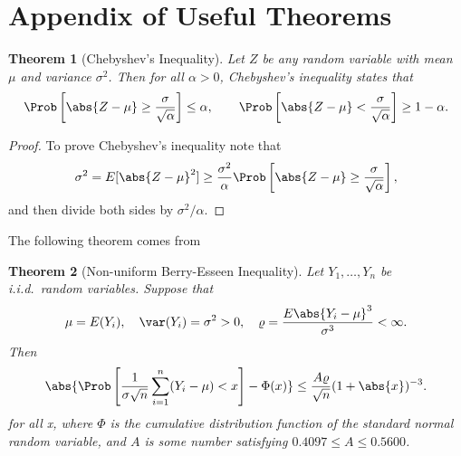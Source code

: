 \documentclass[12pt]{amsart}
\newtheorem{theorem}{Theorem}
\begin{document}
\section*{Appendix of Useful Theorems}
\begin{theorem}[Chebyshev's Inequality] \label{Chebineqthm} Let $Z$ be any random variable with mean $\mu$ and variance $\sigma^2$.  Then for all $\alpha >0$, Chebyshev's inequality states that
\[
\Prob\left[\abs{Z-\mu} \ge \frac{\sigma}{\sqrt{\alpha}} \right] \le \alpha, \qquad \Prob\left[\abs{Z-\mu} < \frac{\sigma}{\sqrt{\alpha}} \right] \ge 1-\alpha.
\]
\end{theorem}
\begin{proof}To prove Chebyshev's inequality note that
\begin{equation*}
\sigma^2 = E[\abs{Z-\mu}^2] \ge \frac{\sigma^2}{\alpha} \Prob\left[\abs{Z-\mu} \ge \frac{\sigma}{\sqrt{\alpha}} \right],
\end{equation*}
and then divide both sides by $\sigma^2/\alpha$.
\end{proof}
The following theorem comes from \cite[Theorem 5.16, p. 168]{Pet95a}
\begin{theorem}[Non-uniform Berry-Esseen Inequality] \label{BE} Let $Y_1,\dots,Y_n$ be i.i.d.\ random variables.  Suppose that
\[
\mu=E(Y_i), \quad \var(Y_i)=\sigma^2>0, \quad \varrho=\frac{E\abs{Y_i - \mu}^3}{\sigma^3} < \infty.
\]
Then
\[
\abs{\Prob\left[\frac{1}{\sigma\sqrt{n}}\sum_{i=1}^{n}(Y_i-\mu)<x
\right]-\Phi(x)}\leq \frac{A \varrho}{\sqrt{n}}(1+\abs{x})^{-3}.
\] for all x,
where $\Phi$ is the cumulative distribution function of the standard normal random variable, and $A$ is some number satisfying $0.4097\leq A\leq 0.5600$.
\end{theorem}
\end{document}
